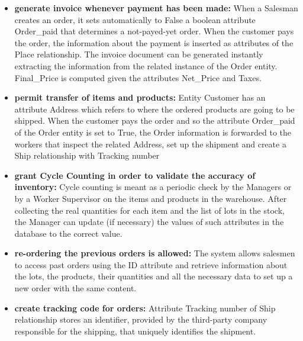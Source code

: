 \begin{itemize}
    \item \textbf{generate invoice whenever payment has been made:} When a Salesman creates an order, it sets automatically to False a boolean attribute Order\_paid that determines a not-payed-yet order. When the customer pays the order, the information about the payment is inserted as attributes of the Place relationship. The invoice document can be generated instantly extracting the information from the related instance of the Order entity. Final\_Price is computed given the attributes Net\_Price and Taxes.
    \item \textbf{permit transfer of items and products:} Entity Customer has an attribute Address which refers to where the ordered products are going to be shipped. When the customer pays the order and so the attribute Order\_paid of the Order entity is set to True, the Order information is forwarded to the workers that inspect the related Address, set up the shipment and create a Ship relationship with Tracking number
    \item \textbf{grant Cycle Counting in order to validate the accuracy of inventory:} Cycle counting is meant as a periodic check by the Managers or by a Worker Supervisor on the items and products in the warehouse. After collecting the real quantities for each item and the list of lots in the stock, the Manager can update (if necessary) the values of such attributes in the database to the correct value.
    \item \textbf{re-ordering the previous orders is allowed:} The system allows salesmen to access past orders using the ID attribute and retrieve information about the lots, the products, their quantities and all the necessary data to set up a new order with the same content.
    \item \textbf{create tracking code for orders:} Attribute Tracking number of Ship relationship stores an identifier, provided by the third-party company responsible for the shipping, that uniquely identifies the shipment.
\end{itemize}








